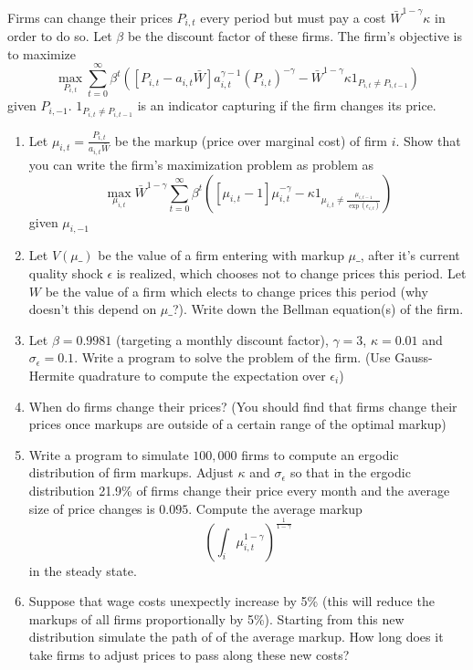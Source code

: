 \documentclass{exam}
\begin{document}
 Firms can change their prices $P_{i,t}$ every period but must pay a cost $\bar W^{1-\gamma}\kappa$ in order to do so.  Let $\beta$ be the discount factor of these firms. The firm's objective is to maximize
 \begin{equation}
 	\max_{P_{i,t}} \sum_{t=0}^\infty \beta^t\left([P_{i,t}-a_{i,t}\bar W]a_{i,t}^{\gamma-1}\left(P_{i,t}\right)^{-\gamma}-\bar W^{1-\gamma}\kappa1_{P_{i,t}\neq P_{i,t-1}}\right)
 \end{equation}given $P_{i,-1}$. $1_{P_{i,t}\neq P_{i,t-1}}$ is an indicator capturing if the firm changes its price.  
 \begin{enumerate}
 	\item Let $\mu_{i,t}=\frac{P_{i,t}}{a_{i,t}\bar W}$ be the markup (price over marginal cost) of firm $i$.  Show that you can write the firm's maximization problem as problem as 
 	\begin{equation}
 		\max_{\mu_{i,t}}\bar W^{1-\gamma}\sum_{t=0}^\infty \beta^t\left([\mu_{i,t}-1]\mu_{i,t}^{-\gamma}-\kappa1_{\mu_{i,t}\neq \frac{\mu_{i,t-1}}{\exp(\epsilon_{i,t})}}\right)
 	\end{equation}given $\mu_{i,-1}$
 	\item  Let $V(\mu\_)$ be the value of a firm entering with markup $\mu\_$, after it's current quality shock $\epsilon$ is realized,  which chooses not to change prices this period.  Let $W$ be the value of a firm which elects to change prices this period (why doesn't this depend on $\mu\_$?).  Write down the Bellman equation(s) of the firm.
 	\item  Let $\beta=0.9981$ (targeting a monthly discount factor), $\gamma =3$, $\kappa =0.01$ and $\sigma_\epsilon = 0.1$.  Write a program to solve the problem of the firm. (Use Gauss-Hermite quadrature to compute the expectation over $\epsilon_i$)
 	\item  When do firms change their prices? (You should find that firms change their prices once markups are outside of a certain range of the optimal markup)
 	\item  Write a program to simulate $100,000$ firms to compute an ergodic distribution of firm markups.  Adjust $\kappa$ and $\sigma_\epsilon$ so that in the ergodic distribution 21.9\% of firms change their price every month and the average size of price changes is $0.095$. Compute the average markup
 	\begin{equation*}
 		\left(\int_i\mu_{i,t}^{1-\gamma}\right)^\frac1{1-\gamma}
 	\end{equation*}in the steady state.
 	\item  Suppose that wage costs unexpectly increase by 5\% (this will reduce the markups of all firms proportionally by 5\%).  Starting from this new distribution simulate the path of of the average markup.  How long does it take firms to adjust prices to pass along these new costs?
 \end{enumerate}
\end{document}
